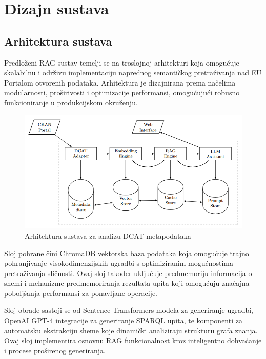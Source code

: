 \chapter{Dizajn sustava}
\label{ch:system_design}


\section{Arhitektura sustava}
\label{sec:architecture}

Predloženi RAG sustav temelji se na troslojnoj arhitekturi koja omogućuje skalabilnu i održivu implementaciju naprednog semantičkog pretraživanja nad EU Portalom otvorenih podataka. Arhitektura je dizajnirana prema načelima modularnosti, proširivosti i optimizacije performansi, omogućujući robusno funkcioniranje u produkcijskom okruženju.

\begin{figure}[htbp]
    \centering
    \includegraphics[width=\textwidth]{figures/system_architecture.png}
    \caption{Arhitektura sustava za analizu DCAT metapodataka}
    \label{fig:system_architecture}
\end{figure}

Sloj pohrane čini ChromaDB vektorska baza podataka koja omogućuje trajno pohranjivanje visokodimenzijskih ugradbi s optimiziranim mogućnostima pretraživanja sličnosti. Ovaj sloj također uključuje predmemoriju informacija o shemi i mehanizme predmemoriranja rezultata upita koji omogućuju značajna poboljšanja performansi za ponavljane operacije.

Sloj obrade sastoji se od Sentence Transformers modela za generiranje ugradbi, OpenAI GPT-4 integracije za generiranje SPARQL upita, te komponenti za automatsku ekstrakciju sheme koje dinamički analiziraju strukturu grafa znanja. Ovaj sloj implementira osnovnu RAG funkcionalnost kroz inteligentno dohvaćanje i procese proširenog generiranja.

